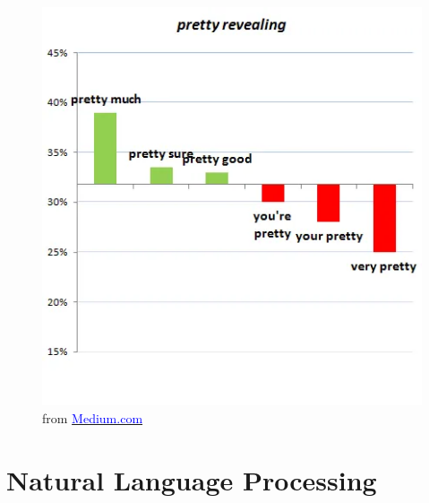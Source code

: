 \documentclass[aspectratio=169]{beamer}
\begin{document}
\begin{frame}
\begin{figure}
\begin{minipage}{.3\textwidth}
        \end{minipage}
        \begin{minipage}{.3\textwidth}
            \includegraphics[width = \textwidth]{cupid_3.png}
        \end{minipage}
        \caption*{from \href{https://medium.com/p/2bf680806c72}{\textcolor{blue}{Medium.com}}}
    \end{figure}

\end{frame}

\section[NLP]{Natural Language Processing}
\end{document}
